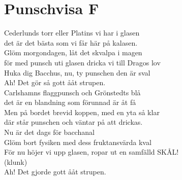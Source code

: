 \section{Punschvisa F}
Cederlunds torr eller Platins vi har i glasen\\
det är det bästa som vi får här på kalasen.\\
Glöm morgondagen, låt det skvalpa i magen\\
för med punsch uti glasen dricka vi till Dragos lov\\
Huka dig Bacchus, nu, ty punschen den är sval\\
Ah! Det gör så gott ååt strupen.\\

Carlshamns flaggpunsch och Grönstedts blå\\
det är en blandning som förunnad är åt få\\
Men på bordet brevid koppen, med en yta så klar\\
där står punschen och väntar på att drickas.\\
Nu är det dags för bacchanal\\
Glöm bort fysiken med dess fruktansvärda kval\\
För nu höjer vi upp glasen, ropar ut en samfälld SKÅL!\\

(klunk)\\

Ah! Det gjorde gott ååt strupen.\\